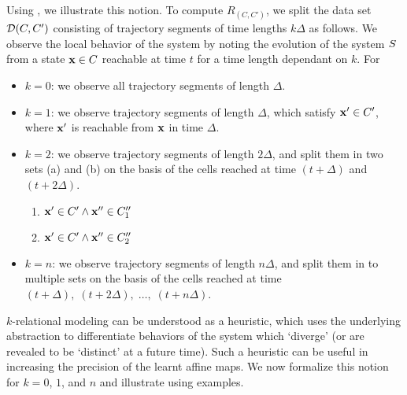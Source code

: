 Using , we illustrate this notion. To compute
$R_{(C,C')}$, we
split the data set $\mathcal{D}(C,C')$ consisting of trajectory segments of time lengths
$k\Delta$ as follows.  We observe the local behavior of the system by
noting the evolution of the system $S$ from a state $\mathbf{x} \in C$
reachable at time $t$ for a time length dependant on $k$. For
\begin{itemize}
    \item{$k=0$}: we observe all trajectory segments of length $\Delta$.
    \item{$k=1$}: we observe trajectory segments of length $\Delta$,
        which satisfy $\mathbf{x}'\in C'$, where $\mathbf{x}'$ is reachable from
        $\mathbf{x}$ in time $\Delta$.
    \item{$k=2$}: we observe trajectory segments of length $2\Delta$,
        and split them in two sets (a) and (b) on the basis of the
        cells reached at time $(t+\Delta)$ and $(t+2\Delta)$.
        \begin{enumerate}[label=\alph*]
            \item $\mathbf{x}' \in C' \land \mathbf{x}''\in C''_1$
            \item $\mathbf{x}' \in C' \land \mathbf{x}'' \in C''_2$
        \end{enumerate}
    \item{$k=n$}: we observe trajectory segments of length $n\Delta$,
        and split them in to multiple sets on the basis of the cells
        reached at time $(t+\Delta),\; (t+2\Delta),\;
        \ldots,\;(t+n\Delta)$.
\end{itemize}

$k$-relational modeling can be understood as a heuristic, which uses
the underlying abstraction to differentiate behaviors of the system
which `diverge' (or are revealed to be `distinct' at a future time).
Such a heuristic can be useful in increasing the precision of the
learnt affine maps.  We now formalize this notion for $k=0$, $1$, and
$n$ and illustrate using examples.



